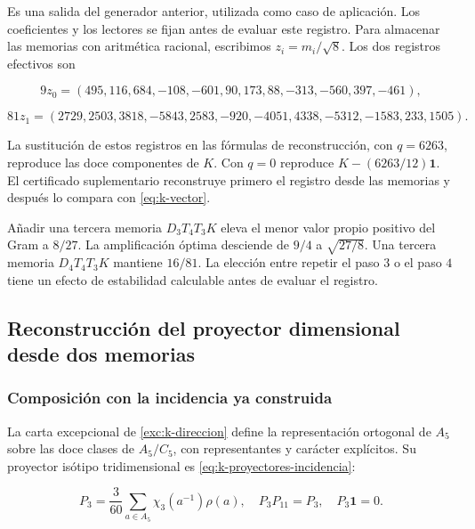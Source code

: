 Es una salida del generador anterior, utilizada como caso de
aplicación. Los coeficientes y los lectores se fijan antes de
evaluar este registro. Para almacenar las memorias con aritmética
racional, escribimos \(z_i=m_i/\sqrt8\).
Los dos registros efectivos son



\[
9z_0=(495,116,684,-108,-601,90,173,88,-313,-560,397,-461),
\]





\begin{equation}
81z_1=(2729,2503,3818,-5843,2583,-920,-4051,4338,-5312,-1583,233,1505).
\label{nuc11:eq:11}
\end{equation}



La sustitución de estos registros en las fórmulas de reconstrucción,
con \(q=6263\), reproduce las doce componentes de \(K\).
Con \(q=0\) reproduce \(K-(6263/12)\mathbf1\).
El certificado suplementario reconstruye primero el registro desde
las memorias y después lo compara con \eqref{eq:k-vector}.

Añadir una tercera memoria \(D_3T_4T_3K\) eleva el menor valor
propio positivo del Gram a \(8/27\).
La amplificación óptima desciende de \(9/4\) a \(\sqrt{27/8}\).
Una tercera memoria \(D_4T_4T_3K\) mantiene \(16/81\).
La elección entre repetir el paso \(3\) o el paso \(4\) tiene
un efecto de estabilidad calculable antes de evaluar el registro.

\subsection{Reconstrucción del proyector dimensional desde dos memorias}

\subsubsection{Composición con la incidencia ya construida}

La carta excepcional de \cref{exc:k-direccion} define la
representación ortogonal de \(A_5\) sobre las doce clases de
\(A_5/C_5\), con representantes y carácter explícitos.
Su proyector isótipo tridimensional es
\eqref{eq:k-proyectores-incidencia}:



\begin{equation}
P_3=\frac3{60}\sum_{a\in A_5}\chi_3(a^{-1})\rho(a),
\quad P_3P_{11}=P_3,\quad P_3\mathbf1=0.
\label{nuc11:eq:12}
\end{equation}



